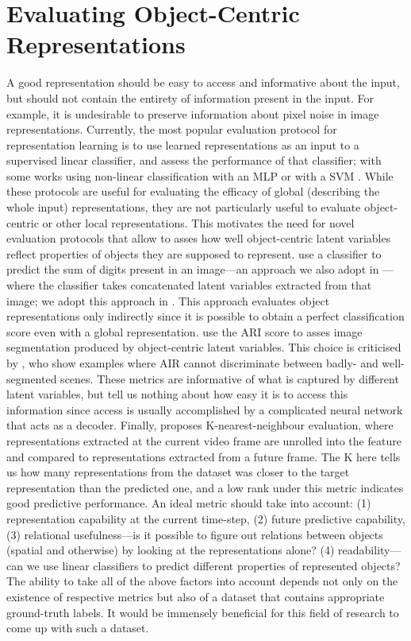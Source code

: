 \section{Evaluating Object-Centric Representations}
A good representation should be easy to access and informative about the input, but should not contain the entirety of information present in the input.
For example, it is undesirable to preserve information about pixel noise in image representations.
Currently, the most popular evaluation protocol for representation learning is to use learned representations as an input to a supervised linear classifier, and assess the performance of that classifier; with some works using non-linear classification with an \gls{MLP} \citep{Henaff2019efficient} or with a \gls{SVM} \citep{Hjelm2019deepinfomax}.
While these protocols are useful for evaluating the efficacy of global (describing the whole input) representations, they are not particularly useful to evaluate object-centric or other local representations.
This motivates the need for novel evaluation protocols that allow to asses how well object-centric latent variables reflect properties of objects they are supposed to represent.
\cite{Eslami2016air} use a classifier to predict the sum of digits present in an image---an approach we also adopt in --- where the classifier takes concatenated latent variables extracted from that image; we adopt this approach in .
This approach evaluates object representations only indirectly since it is possible to obtain a perfect classification score even with a global representation.
\cite{Burgess2019monet,Greff2019multi} use the \gls{ARI} score to asses image segmentation produced by object-centric latent variables.
This choice is criticised by 
\cite{Engelcke2019genesis}, who show examples where \gls{AIR} cannot discriminate between badly- and well-segmented scenes.
These metrics are informative of what is captured by different latent variables, but tell us nothing about how easy it is to access this information since access is usually accomplished by a complicated neural network that acts as a decoder.
Finally, \cite{Kipf2019cswm} proposes K-nearest-neighbour evaluation, where representations extracted at the current video frame are unrolled into the feature and compared to representations extracted from a future frame. The K here tells us how many representations from the dataset was closer to the target representation than the predicted one, and a low rank under this metric indicates good predictive performance.
An ideal metric should take into account:
(1) representation capability at the current time-step,
(2) future predictive capability,
(3) relational usefulness---is it possible to figure out relations between objects (spatial and otherwise) by looking at the representations alone?
(4) readability---can we use linear classifiers to predict different properties of represented objects?
%
The ability to take all of the above factors into account depends not only on the existence of respective metrics but also of a dataset that contains appropriate ground-truth labels.
It would be immensely beneficial for this field of research to come up with such a dataset.

